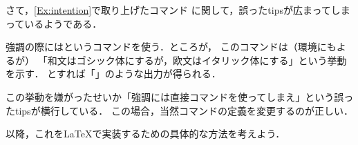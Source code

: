 さて，\cref{Ex:intention}で取り上げたコマンド%
%
に関して，誤ったtipsが広まってしまっているようである．

\begin{Ex} \label{Ex:changedef}
    強調の際にはというコマンドを使う．ところが，
    このコマンドは（環境にもよるが）
    「和文はゴシック体にするが，欧文はイタリック体にする」という挙動を示す．
    とすれば「」のような出力が得られる． 
    
    この挙動を嫌がったせいか「強調には直接コマンドを使ってしまえ」という誤ったtipsが横行している．
    この場合，当然コマンドの定義を変更するのが正しい．
\end{Ex}

以降，これを{\LaTeX}で実装するための具体的な方法を考えよう．